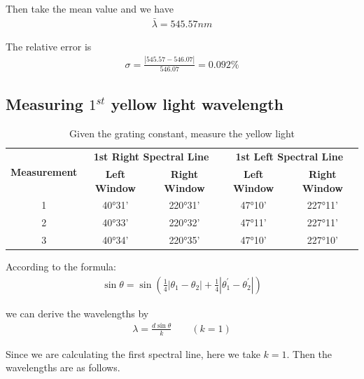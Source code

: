 \documentclass[UTF8]{article}
\begin{document}
	Then take the mean value and we have 
	\begin{eqnarray}
	\bar{\lambda} = 545.57 nm
	\end{eqnarray}
	
	The relative error is
	\begin{eqnarray}
	\sigma = \frac{| 545.57 - 546.07|}{546.07} = 0.092\%
	\end{eqnarray}
	

   \subsection{Measuring $1^{st}$ yellow light wavelength}
   
   	 \begin{table}[htbp]
   	 	  \centering
   	 	  \caption{Given the grating constant, measure the yellow light}
   	 	  \begin{tabular}{ccccc}
   	 	    \toprule[2pt]
   	 	    \multirow{2}{*}{\textbf{Measurement}} & \multicolumn{2}{c}{\textbf{1st Right Spectral Line}} & \multicolumn{2}{c}{\textbf{1st Left Spectral Line}} \\
   	 	    \cline{2-5}
   	 	    & \textbf{Left Window} & \textbf{Right Window} &  \textbf{Left Window} & \textbf{Right Window}\\
   	 	    \midrule
		    1 & 40°31' & 220°31' & 47°10' & 227°11' \\
		    2 & 40°33' & 220°32' & 47°11' & 227°11' \\
		    3 & 40°34' & 220°35' & 47°10' & 227°10' \\
   	 	    \bottomrule[2pt]
   	 	  \end{tabular}
   	 	\end{table}
   	 	
   	 	According to the formula:
   	 	\begin{eqnarray}
   	 	\sin \theta = \sin (\frac{1}{4}\left | \theta_1 - \theta_2 \right | + \frac{1}{4}\left | \theta_1^{'} - \theta_2^{'} \right |)
   	 	\end{eqnarray}
   	 	
   	 	we can derive the wavelengths by
   	 	\begin{eqnarray}
   	 	\lambda = \frac{d\sin \theta}{k} \qquad (k = 1)
   	 	\end{eqnarray}
   	 	
   	 	Since we are calculating the first spectral line, here we take $k = 1$. Then the wavelengths are as follows.
   	 
\end{document}
